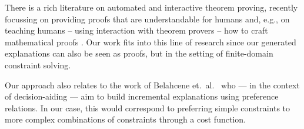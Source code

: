 There is a rich literature on automated and interactive theorem proving, recently focussing on providing proofs that are understandable for humans \cite{Ganesalingam2017} and, e.g.,  on teaching humans -- using interaction with theorem provers -- how to craft mathematical proofs \cite{DBLP:conf/icml/YangD19}. 
Our work fits into this line of research since our generated explanations can also be seen as proofs, but in the setting of finite-domain constraint solving.

Our approach also relates to the work of Belahcene et.\ al.~\cite{belahcene2017explaining} who --- in the context of decision-aiding --- aim to build incremental explanations using preference relations. In our case, this would correspond to preferring simple constraints to more complex combinations of constraints through a cost function.